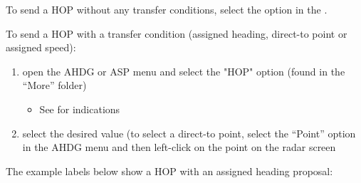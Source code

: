 \documentclass[a4paper,oneside,11pt]{memoir}
\begin{document}
\bigskip

To send a HOP without any transfer conditions, select the  option in the .

\bigskip

To send a HOP with a transfer condition (assigned heading, direct-to point or assigned speed):

\begin{enumerate}
  \item open the AHDG or ASP menu and select the "HOP" option (found in the “More” folder)
  \begin{itemize}
    \item See  for indications
  \end{itemize}
  \item select the desired value (to select a direct-to point, select the “Point” option in the AHDG menu and then left-click on the point on the radar screen
\end{enumerate}

The example labels below show a HOP with an assigned heading proposal:
\end{document}
